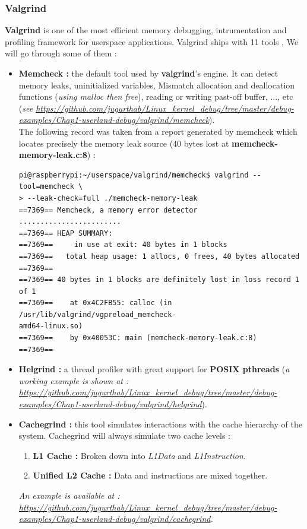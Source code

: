 \subsubsection{Valgrind}
\textbf{Valgrind} is one of the most efficient memory debugging, intrumentation and profiling framework for userspace applications. Valgrind ships with 11 tools , We will go through some of them :
\begin{itemize}
	\item \textbf{Memcheck : } the default tool used by \textbf{valgrind}'s engine. It can detect memory leaks, uninitialized variables, Mismatch allocation and deallocation functions (\textit{using malloc then free}), reading or writing past-off buffer, ..., etc (\textit{see {\color{blue}\url{https://github.com/jugurthab/Linux_kernel_debug/tree/master/debug-examples/Chap1-userland-debug/valgrind/memcheck}}}).\\
	
The following record was taken from a report generated by memcheck which locates precisely the memory leak source (40 bytes lost at \textbf{memcheck-memory-leak.c:8}) :

		\begin{lstlisting}[style=BashInputStyle]
pi@raspberrypi:~/userspace/valgrind/memcheck$ valgrind --tool=memcheck \
> --leak-check=full ./memcheck-memory-leak 
==7369== Memcheck, a memory error detector
........................
==7369== HEAP SUMMARY:
==7369==     in use at exit: 40 bytes in 1 blocks
==7369==   total heap usage: 1 allocs, 0 frees, 40 bytes allocated
==7369== 
==7369== 40 bytes in 1 blocks are definitely lost in loss record 1 of 1
==7369==    at 0x4C2FB55: calloc (in /usr/lib/valgrind/vgpreload_memcheck-
amd64-linux.so)
==7369==    by 0x40053C: main (memcheck-memory-leak.c:8)
==7369== 
		\end{lstlisting}
	
	\item \textbf{Helgrind : } a thread profiler with great support for \textbf{POSIX pthreads} (\textit{a working example is shown at : {\color{blue} \url{https://github.com/jugurthab/Linux_kernel_debug/tree/master/debug-examples/Chap1-userland-debug/valgrind/helgrind}}}).	
	
	\item \textbf{Cachegrind : } this tool simulates interactions with the cache hierarchy of the system. Cachegrind will always simulate two cache levels :
		\begin{enumerate}
			\item {\textbf{L1 Cache :} Broken down into \emph{L1Data} and \emph{L1Instruction}.}
			\item {\textbf{Unified L2 Cache :} Data and instructions are mixed together.}
		\end{enumerate}			
\textit{An example is available at : {\color{blue}\url{https://github.com/jugurthab/Linux_kernel_debug/tree/master/debug-examples/Chap1-userland-debug/valgrind/cachegrind}}.}
	

\end{itemize}
